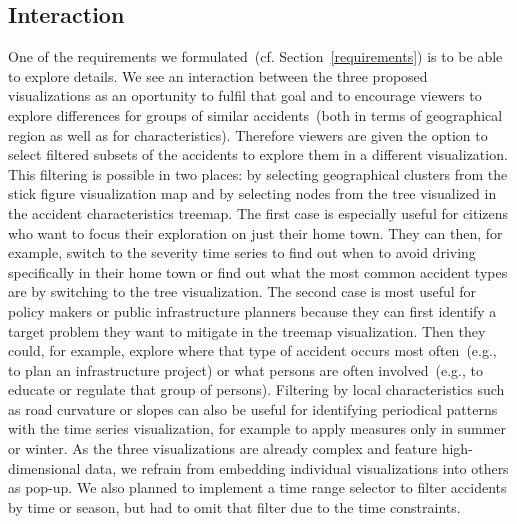 \subsection{Interaction}
\label{interaction}
One of the requirements we formulated~(cf. Section~\ref{requirements}) is to be able to explore details. 
We see an interaction between the three proposed visualizations as an oportunity to fulfil that goal and to encourage viewers to explore differences for groups of similar accidents~(both in terms of geographical region as well as for characteristics).
Therefore viewers are given the option to select filtered subsets of the accidents to explore them in a different visualization.
This filtering is possible in two places: \Ni by selecting geographical clusters from the stick figure visualization map and \Nii by selecting nodes from the tree visualized in the accident characteristics treemap.
The first case is especially useful for citizens who want to focus their exploration on just their home town. They can then, for example, switch to the severity time series to find out when to avoid driving specifically in their home town or find out what the most common accident types are by switching to the tree visualization. The second case is most useful for policy makers or public infrastructure planners because they can first identify a target problem they want to mitigate in the treemap visualization. Then they could, for example, explore where that type of accident occurs most often~(e.g., to plan an infrastructure project) or what persons are often involved~(e.g., to educate or regulate that group of persons). Filtering by local characteristics such as road curvature or slopes can also be useful for identifying periodical patterns with the time series visualization, for example to apply measures only in summer or winter.
As the three visualizations are already complex and feature high-dimensional data, we refrain from embedding individual visualizations into others as pop-up.
We also planned to implement a time range selector to filter accidents by time or season, but had to omit that filter due to the time constraints.
